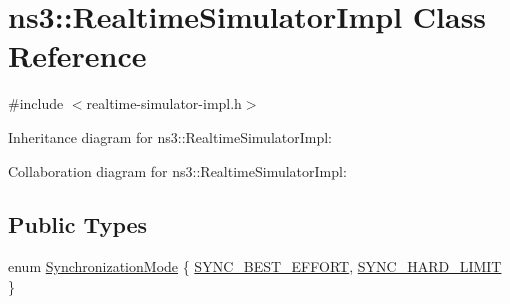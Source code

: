 \hypertarget{classns3_1_1RealtimeSimulatorImpl}{}\section{ns3\+:\+:Realtime\+Simulator\+Impl Class Reference}
\label{classns3_1_1RealtimeSimulatorImpl}


{\ttfamily \#include $<$realtime-\/simulator-\/impl.\+h$>$}



Inheritance diagram for ns3\+:\+:Realtime\+Simulator\+Impl\+:


Collaboration diagram for ns3\+:\+:Realtime\+Simulator\+Impl\+:
\subsection*{Public Types}
\begin{DoxyCompactItemize}
\item 
enum \hyperlink{classns3_1_1RealtimeSimulatorImpl_a97b84e6926b9602a6d7c7326bf485807}{Synchronization\+Mode} \{ \hyperlink{classns3_1_1RealtimeSimulatorImpl_a97b84e6926b9602a6d7c7326bf485807aa22b68b600e38987c93c0b3eb786aefe}{S\+Y\+N\+C\+\_\+\+B\+E\+S\+T\+\_\+\+E\+F\+F\+O\+RT}, 
\hyperlink{classns3_1_1RealtimeSimulatorImpl_a97b84e6926b9602a6d7c7326bf485807ada42280d3e94930f3335552b4a93a36d}{S\+Y\+N\+C\+\_\+\+H\+A\+R\+D\+\_\+\+L\+I\+M\+IT}
 \}
\end{DoxyCompactItemize}
